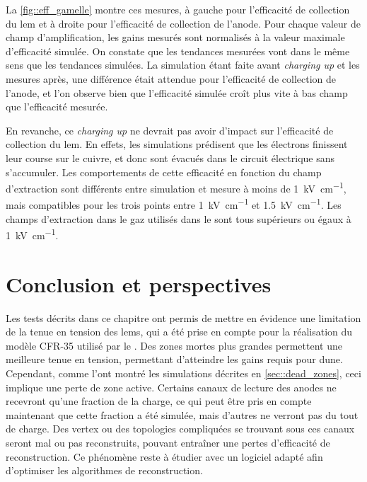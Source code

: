       La \autoref{fig::eff_gamelle} montre ces mesures, à gauche pour l'efficacité de collection du \gls{lem} et à droite pour l'efficacité de collection de l'anode. Pour chaque valeur de champ d'amplification, les gains mesurés sont normalisés à la valeur maximale d'efficacité simulée. On constate que les tendances mesurées vont dans le même sens que les tendances simulées. La simulation étant faite avant \textit{charging up} et les mesures après, une différence était attendue pour l'efficacité de collection de l'anode, et l'on observe bien que l'efficacité simulée croît plus vite à bas champ que l'efficacité mesurée.

      En revanche, ce \textit{charging up} ne devrait pas avoir d'impact sur l'efficacité de collection du \gls{lem}. En effets, les simulations prédisent que les électrons finissent leur course sur le cuivre, et donc sont évacués dans le circuit électrique sans s'accumuler. Les comportements de cette efficacité en fonction du champ d'extraction sont différents entre simulation et mesure à moins de \SI{1}{\kilo\volt\per\centi\meter}, mais compatibles pour les trois points entre \SI{1}{\kilo\volt\per\centi\meter} et \SI{1.5}{\kilo\volt\per\centi\meter}. Les champs d'extraction dans le gaz utilisés dans le \TOO{} sont tous supérieurs ou égaux à \SI{1}{\kilo\volt\per\centi\meter}.

       
  \section{Conclusion et perspectives}

    Les tests décrits dans ce chapitre ont permis de mettre en évidence une limitation de la tenue en tension des \glspl{lem}, qui a été prise en compte pour la réalisation du modèle CFR-35 utilisé par le \SSS{}. Des zones mortes plus grandes permettent une meilleure tenue en tension, permettant d'atteindre les gains requis pour \gls{dune}. Cependant, comme l'ont montré les simulations décrites en \autoref{sec::dead_zones}, ceci implique une perte de zone active. Certains canaux de lecture des anodes ne recevront qu'une fraction de la charge, ce qui peut être pris en compte maintenant que cette fraction a été simulée, mais d'autres ne verront pas du tout de charge. Des vertex ou des topologies compliquées se trouvant sous ces canaux seront mal ou pas reconstruits, pouvant entraîner une pertes d'efficacité de reconstruction. Ce phénomène reste à étudier avec un logiciel adapté afin d'optimiser les algorithmes de reconstruction.

